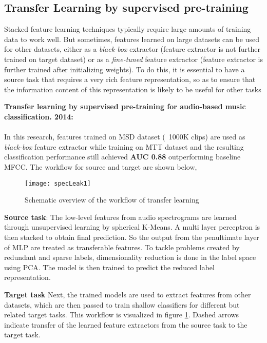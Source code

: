 \subsection{Transfer Learning by supervised pre-training}
\label{transfer}
Stacked feature learning techniques  typically require large amounts of training data to work well. But sometimes, features learned on large datasets can be used for other datasets, either as a \textit{black-box} extractor (feature extractor is not further trained on target dataset) or as a \textit{fine-tuned} feature extractor (feature extractor is further trained after initializing weights). To do this, it is essential to have a source task that requires a very rich feature representation, so as to ensure that the information content of this representation is likely to be useful for other tasks
\bigskip

\noindent \textbf{Transfer learning by supervised pre-training for audio-based music classification. 2014\cite{TransferLearning}:}\\
\\
In this research, features trained on MSD dataset (~1000K clips) are used as \textit{black-box} feature extractor while training on MTT dataset and the resulting classification performance still achieved \textbf{AUC 0.88} outperforming baseline MFCC. The workflow for source and target are shown below,
\begin{figure}[h] 
\centering
\texttt{[image: specLeak1]}
\caption{Schematic overview of the workflow of transfer learning\cite{TransferLearning}}
 \label{fig:transfer learning}
 \end{figure}
\FloatBarrier
\bigskip

\noindent \textbf{Source task}: 
The low-level features from audio spectrograms are learned through unsupervised learning by spherical K-Means. A multi layer perceptron is then stacked to obtain final prediction. So the output from the penultimate layer of MLP are treated as transferable features. To tackle problems created by redundant and sparse labels, dimensionality reduction is done in the label space using PCA. The model is then trained to predict the reduced label representation.
\bigskip

\noindent \textbf{Target task}
Next,  the trained models are used to extract features from other datasets, which are then passed to train shallow classifiers for different but related target tasks. This workflow is visualized in figure \ref{fig:transfer learning}. Dashed arrows indicate transfer of the learned feature extractors from the source task to the target task.
\bigskip


